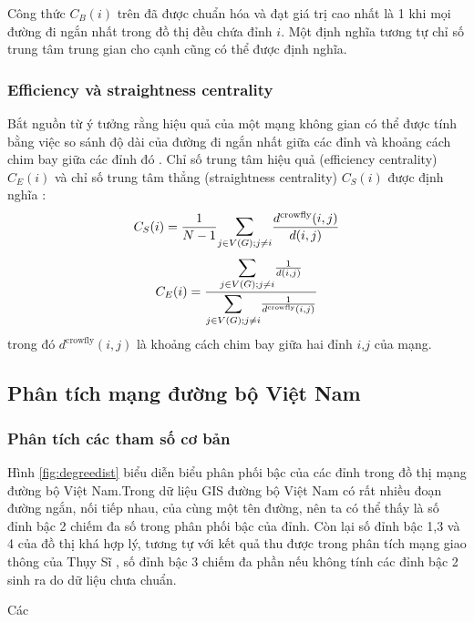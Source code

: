 \documentclass[14pt, oneside, a4paper, openany]{scrartcl}
\begin{document}
Công thức $C_B(i)$ trên đã được chuẩn hóa và đạt giá trị cao nhất là 1 khi mọi đường đi ngắn nhất trong đồ thị đều chứa đỉnh $i$. Một định nghĩa tương tự chỉ số trung tâm trung gian cho cạnh cũng có thể được định nghĩa.

\subsubsection{Efficiency và straightness centrality}
Bắt nguồn từ ý tưởng rằng hiệu quả của một mạng không gian có thể được tính bằng việc so sánh độ dài của đường đi ngắn nhất giữa các đỉnh và khoảng cách chim bay giữa các đỉnh đó \cite{efficiency01}. Chỉ số trung tâm hiệu quả (efficiency centrality) $C_E(i)$ và chỉ số trung tâm thẳng (straightness centrality) $C_S(i)$ được định nghĩa \cite{efficiency02}:
\begin{equation}
C_S(i) = \frac{1}{N-1} \mathlarger{\sum}_{j \in V(G); j \neq i} \frac{d^{\text{crowfly}}(i,j)}{d(i,j)}
\end{equation}
\begin{equation}
	C_E(i) = \frac{\mathlarger{\sum}_{j \in V(G); j \neq i}\frac{1}{d(i,j)}}{\mathlarger{\sum}_{j \in V(G); j \neq i}\frac{1}{d^{\text{crowfly}}(i,j)}}
\end{equation}
trong đó $d^{\text{crowfly}}(i,j)$ là khoảng cách chim bay giữa hai đỉnh $i$,$j$ của mạng.

\subsection{Phân tích mạng đường bộ Việt Nam}
\newpage
\subsubsection{Phân tích các tham số cơ bản}
Hình \ref{fig:degreedist} biểu diễn biểu phân phối bậc của các đỉnh trong đồ thị mạng đường bộ Việt Nam.Trong dữ liệu GIS đường bộ Việt Nam có rất nhiều đoạn đường ngắn, nối tiếp nhau, của cùng một tên đường, nên ta có thể thấy là số đỉnh bậc 2 chiếm đa số trong phân phối bậc của đỉnh. Còn lại số đỉnh bậc 1,3 và 4 của đồ thị khá hợp lý, tương tự với kết quả thu được trong phân tích mạng giao thông của Thụy Sĩ \cite{swissroad}, số đỉnh bậc 3 chiếm đa phần nếu không tính các đỉnh bậc 2 sinh ra do dữ liệu chưa chuẩn.

Các 
\end{document}
